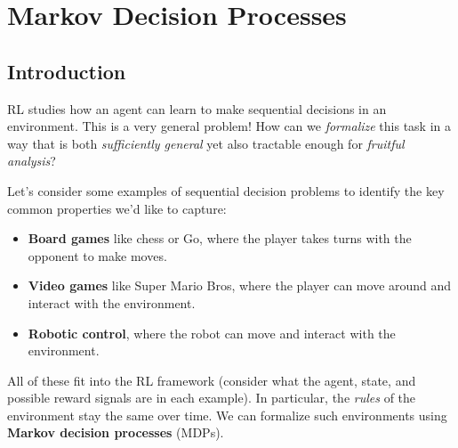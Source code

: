 \documentclass[../main/main]{subfiles}
\begin{document}
    
\chapter{Markov Decision Processes}

\tableofcontents

\section{Introduction}

RL studies how an agent can learn to make sequential decisions in an environment. This is a very general problem! How can we \emph{formalize} this task in a way that is both \emph{sufficiently general} yet also tractable enough for \emph{fruitful analysis}?

Let's consider some examples of sequential decision problems to identify the key common properties we'd like to capture:

\begin{itemize}
    \item \textbf{Board games} like chess or Go, where the player takes turns with the opponent to make moves.
    \item \textbf{Video games} like Super Mario Bros, where the player can move around and interact with the environment.
    \item \textbf{Robotic control}, where the robot can move and interact with the environment.
\end{itemize}

All of these fit into the RL framework (consider what the agent, state, and possible reward signals are in each example). In particular, the \emph{rules} of the environment stay the same over time. We can formalize such environments using \textbf{Markov decision processes} (MDPs).



\end{document}
